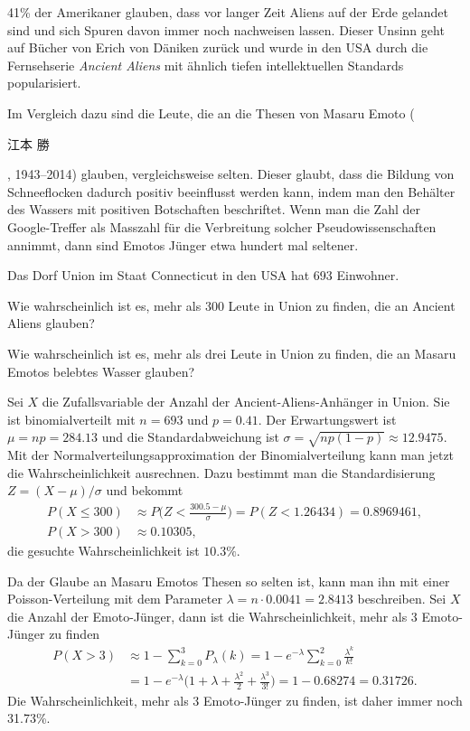 41\% der Amerikaner glauben, dass vor langer Zeit Aliens auf der
Erde gelandet sind und sich Spuren davon immer noch nachweisen lassen.
Dieser Unsinn geht auf Bücher von Erich von Däniken zurück und wurde
in den USA durch die Fernsehserie {\em Ancient Aliens}
mit ähnlich tiefen intellektuellen Standards popularisiert.

Im Vergleich dazu sind die Leute, die an die Thesen von Masaru Emoto
(\begin{CJK}{UTF8}{min}江本 勝\end{CJK}, 1943--2014) glauben,
vergleichsweise selten.
Dieser glaubt, dass die Bildung von Schneeflocken dadurch positiv
beeinflusst werden kann, indem man den Behälter des Wassers mit
positiven Botschaften beschriftet.
Wenn man die Zahl der Google-Treffer als Masszahl für die Verbreitung
solcher Pseudowissenschaften annimmt, dann sind Emotos Jünger etwa
hundert mal seltener.

Das Dorf Union im Staat Connecticut in den USA hat 693 Einwohner.
\begin{teilaufgaben}
\item
Wie wahrscheinlich ist es, mehr als 300 Leute in Union zu finden,
die an Ancient Aliens glauben?
\item
Wie wahrscheinlich ist es, mehr als drei Leute in Union zu finden,
die an Masaru Emotos belebtes Wasser glauben?
\end{teilaufgaben}

\begin{loesung}
\begin{teilaufgaben}
\item
Sei $X$ die Zufallsvariable der Anzahl der Ancient-Aliens-Anhänger in Union.
Sie ist binomialverteilt mit $n=693$ und $p=0.41$.
Der Erwartungswert ist $\mu=np=284.13$ und die Standardabweichung
ist $\sigma=\sqrt{np(1-p)}\approx 12.9475$.
Mit der Normalverteilungsapproximation der Binomialverteilung
kann man jetzt die Wahrscheinlichkeit ausrechnen.
Dazu bestimmt man die Standardisierung $Z=(X-\mu)/\sigma$ und
bekommt
\begin{align*}
P(X\le 300)
&\approx
P\biggl(Z < \frac{300.5-\mu}{\sigma}\biggr)
=
P(Z < 1.26434) = 0.8969461,
\\
P(X>300)
&\approx 0.10305,
\end{align*}
die gesuchte Wahrscheinlichkeit ist $10.3\%$.
\item
Da der Glaube an Masaru Emotos Thesen so selten ist, kann man ihn
mit einer
Poisson-Verteilung mit dem Parameter $\lambda = n\cdot 0.0041=2.8413$
beschreiben.
Sei $X$ die Anzahl der Emoto-Jünger, dann ist die Wahrscheinlichkeit,
mehr als 3 Emoto-Jünger zu finden
\begin{align*}
P(X>3)
&\approx
1-\sum_{k=0}^3 P_\lambda(k)
=
1-e^{-\lambda} \sum_{k=0}^2 \frac{\lambda^k}{k!}
\\
&=
1-e^{-\lambda}\biggl(1+\lambda+\frac{\lambda^2}{2}+\frac{\lambda^3}{3!}\biggr)
=
1- 0.68274
=
0.31726.
\end{align*}
Die Wahrscheinlichkeit, mehr als 3 Emoto-Jünger zu finden, ist daher 
immer noch 31.73\%.
\qedhere
\end{teilaufgaben}
\end{loesung}

